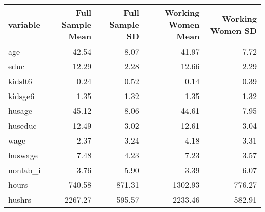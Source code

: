 \begin{tabular}{lrrrr}
  \hline
variable & Full Sample Mean & Full Sample SD & Working Women Mean & Working Women SD \\ 
  \hline
age & 42.54 & 8.07 & 41.97 & 7.72 \\ 
  educ & 12.29 & 2.28 & 12.66 & 2.29 \\ 
  kidslt6 & 0.24 & 0.52 & 0.14 & 0.39 \\ 
  kidsge6 & 1.35 & 1.32 & 1.35 & 1.32 \\ 
  husage & 45.12 & 8.06 & 44.61 & 7.95 \\ 
  huseduc & 12.49 & 3.02 & 12.61 & 3.04 \\ 
  wage & 2.37 & 3.24 & 4.18 & 3.31 \\ 
  huswage & 7.48 & 4.23 & 7.23 & 3.57 \\ 
  nonlab\_i & 3.76 & 5.90 & 3.39 & 6.07 \\ 
  hours & 740.58 & 871.31 & 1302.93 & 776.27 \\ 
  hushrs & 2267.27 & 595.57 & 2233.46 & 582.91 \\ 
   \hline
\end{tabular}
